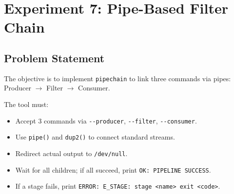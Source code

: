 
\section{Experiment 7: Pipe-Based Filter Chain}

\subsection{Problem Statement}
The objective is to implement \texttt{pipechain} to link three commands via pipes: Producer $\to$ Filter $\to$ Consumer.

The tool must:
\begin{itemize}
    \item Accept 3 commands via \verb|--producer|, \verb|--filter|, \verb|--consumer|.
    \item Use \verb|pipe()| and \verb|dup2()| to connect standard streams.
    \item Redirect actual output to \verb|/dev/null|.
    \item Wait for all children; if all succeed, print \verb|OK: PIPELINE SUCCESS|.
    \item If a stage fails, print \verb|ERROR: E_STAGE: stage <name> exit <code>|.
\end{itemize}

